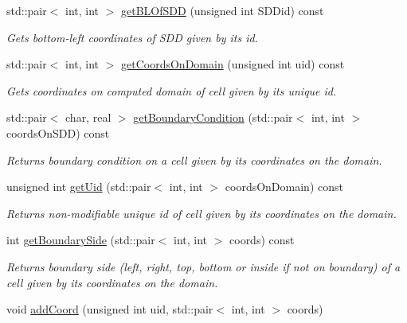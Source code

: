 \begin{DoxyCompactItemize}
std\+::pair$<$ int, int $>$ \hyperlink{classDomain_a29e2005bed3aa17f036b8d2b36084153}{get\+B\+L\+Of\+S\+DD} (unsigned int S\+D\+Did) const
\begin{DoxyCompactList}\small\item\em Gets bottom-\/left coordinates of S\+DD given by its id. \end{DoxyCompactList}\item 
std\+::pair$<$ int, int $>$ \hyperlink{classDomain_a1d2f7ee9336c682d4d6b01893d0beb4f}{get\+Coords\+On\+Domain} (unsigned int uid) const
\begin{DoxyCompactList}\small\item\em Gets coordinates on computed domain of cell given by its unique id. \end{DoxyCompactList}\item 
std\+::pair$<$ char, real $>$ \hyperlink{classDomain_a1f219d1f46645da98f538dada37432f9}{get\+Boundary\+Condition} (std\+::pair$<$ int, int $>$ coords\+On\+S\+DD) const
\begin{DoxyCompactList}\small\item\em Returns boundary condition on a cell given by its coordinates on the domain. \end{DoxyCompactList}\item 
\mbox{\label{classDomain_a657f0b6750e14d1d3cde6afd8b1e9b48}} 
unsigned int \hyperlink{classDomain_a657f0b6750e14d1d3cde6afd8b1e9b48}{get\+Uid} (std\+::pair$<$ int, int $>$ coords\+On\+Domain) const
\begin{DoxyCompactList}\small\item\em Returns non-\/modifiable unique id of cell given by its coordinates on the domain. \end{DoxyCompactList}\item 
\mbox{\label{classDomain_a677ba729e74d00b167b51ab6c921782a}} 
int \hyperlink{classDomain_a677ba729e74d00b167b51ab6c921782a}{get\+Boundary\+Side} (std\+::pair$<$ int, int $>$ coords) const
\begin{DoxyCompactList}\small\item\em Returns boundary side (left, right, top, bottom or inside if not on boundary) of a cell given by its coordinates on the domain. \end{DoxyCompactList}\item 
void \hyperlink{classDomain_a1463e043dbcda6e6755dda83c26d6b73}{add\+Coord} (unsigned int uid, std\+::pair$<$ int, int $>$ coords)

\end{DoxyCompactItemize}
